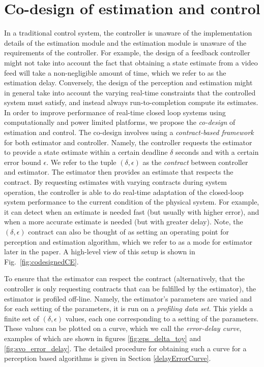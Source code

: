 \section{Co-design of estimation and control}
\label{sec:codesign}

In a traditional control system, %
the controller is unaware of the implementation details of the estimation module and the estimation module is unaware of the requirements of the controller.
For example, the design of a feedback controller might not take into account the fact that obtaining a state estimate from a video feed will take a non-negligible amount of time, which we refer to as the estimation delay.
Conversely, the design of the perception and estimation might in general take into account the varying real-time constraints that the controlled system must satisfy, and instead always run-to-completion compute its estimates.
In order to improve performance of real-time closed loop systems using computationally and power limited platforms, we propose the \emph{co-design} of estimation and control.
The co-design involves using a \emph{contract-based framework} for both estimator and controller.
Namely, the controller requests the estimator to provide a state estimate within a certain deadline $\delta$ seconds and with a certain error bound $\epsilon$.
We refer to the tuple $(\delta,\epsilon)$ as the \emph{contract} between controller and estimator. 
The estimator then provides an estimate that respects the contract.
By requesting estimates with varying contracts during system operation, the controller is able to do real-time adaptation of the closed-loop system performance to the current condition of the physical system.
For example, it can detect when an estimate is needed fast (but usually with higher error), and when a more accurate estimate is needed (but with greater delay). Note, the $(\delta,\epsilon)$ contract can also be thought of as setting an operating point for perception and estimation algorithm, which we refer to as a mode for estimator later in the paper.
A high-level view of this setup is shown in Fig.~\ref{fig:codesignedCE}.

To ensure that the estimator can respect the contract (alternatively, that the controller is only requesting contracts that can be fulfilled by the estimator), the estimator is profiled off-line.
Namely, the estimator's parameters are varied and for each setting of the parameters, it is run on a \emph{profiling data set}. 
This yields a finite set of $(\delta,\epsilon)$ values, each one corresponding to a setting of the parameters.
These values can be plotted on a curve, which we call the \emph{error-delay curve}, examples of which are shown in figures \ref{fig:eps_delta_toy} and \ref{fig:svo_error_delay}.
The detailed procedure for obtaining such a curve for a perception based algorithms is given in Section \ref{delayErrorCurve}.

